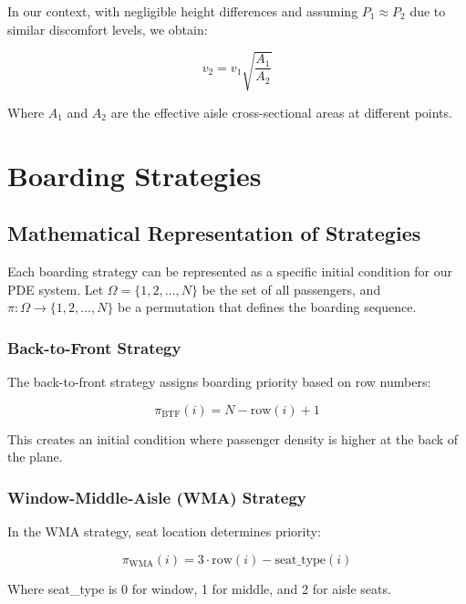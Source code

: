 \documentclass[a4paper,12pt]{article}
\begin{document}
In our context, with negligible height differences and assuming $P_1 \approx P_2$ due to similar discomfort levels, we obtain:

\begin{equation}
v_2 = v_1\sqrt{\frac{A_1}{A_2}}
\end{equation}

Where $A_1$ and $A_2$ are the effective aisle cross-sectional areas at different points.

\section{Boarding Strategies}
\subsection{Mathematical Representation of Strategies}

Each boarding strategy can be represented as a specific initial condition for our PDE system. Let $\Omega = \{1, 2, \ldots, N\}$ be the set of all passengers, and $\pi: \Omega \rightarrow \{1, 2, \ldots, N\}$ be a permutation that defines the boarding sequence.

\subsubsection{Back-to-Front Strategy}

The back-to-front strategy assigns boarding priority based on row numbers:

\begin{equation}
\pi_{\text{BTF}}(i) = N - \text{row}(i) + 1
\end{equation}

This creates an initial condition where passenger density is higher at the back of the plane.

\subsubsection{Window-Middle-Aisle (WMA) Strategy}

In the WMA strategy, seat location determines priority:

\begin{equation}
\pi_{\text{WMA}}(i) = 3 \cdot \text{row}(i) - \text{seat\_type}(i)
\end{equation}

Where seat\_type is 0 for window, 1 for middle, and 2 for aisle seats.
\end{document}
